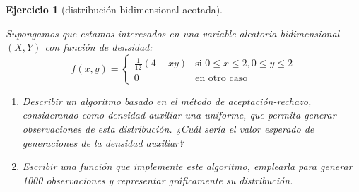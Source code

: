\documentclass[
  spanish,
  10pt,
]{book}
\theoremstyle{break}
\newtheorem{exercise}{Ejercicio}[chapter]
\theoremstyle{nonumberplain}
\begin{document}
\begin{exercise}[distribución bidimensional acotada]
\protect\hypertarget{exr:ar-bidim-r}{}\label{exr:ar-bidim-r}

Supongamos que estamos interesados en una variable aleatoria bidimensional
\(\left( X,Y\right)\) con función de densidad:
\[f(x,y)=\left\{ 
\begin{array}{cl}
\frac{1}{12}(4-xy) & \text{si } 0 \le x \le 2 ,  0 \le y \le 2\\ 
0 & \text{en otro caso}
\end{array}
\right.\]

\begin{enumerate}
\def\labelenumi{\alph{enumi})}
\item
  Describir un algoritmo basado en el método de aceptación-rechazo,
  considerando como densidad auxiliar una uniforme, que permita
  generar observaciones de esta distribución.
  ¿Cuál sería el valor esperado de generaciones de la densidad auxiliar?
\item
  Escribir una función que implemente este algoritmo, emplearla para generar
  1000 observaciones y representar gráficamente su distribución.
\end{enumerate}

\end{exercise}
\end{document}
